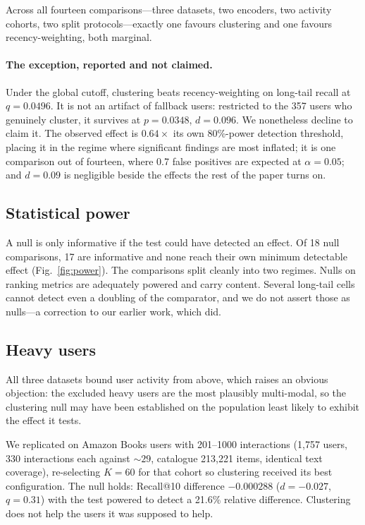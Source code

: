 \documentclass[runningheads]{llncs}
\begin{document}
Across all fourteen comparisons---three datasets, two encoders, two activity cohorts, two
split protocols---exactly one favours clustering and one favours recency-weighting, both
marginal.

\paragraph{The exception, reported and not claimed.} Under the global cutoff, clustering
beats recency-weighting on long-tail recall at $q=0.0496$. It is not an artifact of
fallback users: restricted to the 357 users who genuinely cluster, it survives at
$p=0.0348$, $d=0.096$. We nonetheless decline to claim it. The observed effect is
$0.64\times$ its own 80\%-power detection threshold, placing it in the regime where
significant findings are most inflated; it is one comparison out of fourteen, where 0.7
false positives are expected at $\alpha=0.05$; and $d=0.09$ is negligible beside the
effects the rest of the paper turns on.

\subsection{Statistical power}\label{sec:power}

A null is only informative if the test could have detected an effect. Of 18 null
comparisons, 17 are informative and none reach their own minimum detectable
effect (Fig.~\ref{fig:power}). The comparisons split cleanly into two regimes. Nulls on
ranking metrics are adequately powered and carry content. Several long-tail cells cannot
detect even a doubling of the comparator, and we do not assert those as nulls---a
correction to our earlier work, which did.

\subsection{Heavy users}\label{sec:heavy}

All three datasets bound user activity from above, which raises an obvious objection: the
excluded heavy users are the most plausibly multi-modal, so the clustering null may have
been established on the population least likely to exhibit the effect it tests.

We replicated on Amazon Books users with 201--1000 interactions (1{,}757 users, 330
interactions each against ${\sim}29$, catalogue 213{,}221 items, identical text coverage),
re-selecting $K=60$ for that cohort so clustering received its best configuration. The null
holds: Recall@10 difference $-0.000288$ ($d=-0.027$, $q=0.31$) with the test powered to
detect a 21.6\% relative difference. Clustering does not help the users it was supposed to
help.
\end{document}
